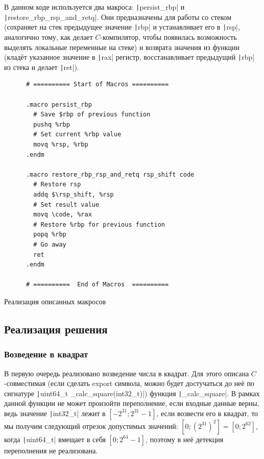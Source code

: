 \documentclass[a4paper]{article}
\begin{document}
  В данном коде используется два макроса: \texttt|persist_rbp| и \texttt|restore_rbp_rsp_and_retq|.
  Они предназначены для работы со стеком (сохраняет на стек предыдущее значение \texttt|rbp|
  и устанавливает его в \texttt|rsp|, аналогично тому, как делает $C$-компилятор, чтобы
  появилась возможность выделять локальные переменные на стеке)
  и возврата значения из функции (кладёт указанное значение в \texttt|rax| регистр,
  восстанавливает предыдущий \texttt|rbp| из стека и делает \texttt|ret|).
  \begin{listing}[H]
    \begin{verbatim}
      # ========== Start of Macros ==========

      .macro persist_rbp
        # Save $rbp of previous function
        pushq %rbp
        # Set current %rbp value
        movq %rsp, %rbp
      .endm
      
      .macro restore_rbp_rsp_and_retq rsp_shift code
        # Restore rsp
        addq $\rsp_shift, %rsp
        # Set result value
        movq \code, %rax
        # Restore %rbp for previous function
        popq %rbp
        # Go away
        ret
      .endm
      
      # ==========  End of Macros  ==========
    \end{verbatim}
    \caption{Реализация описанных макросов}
  \end{listing}

  \subsection{Реализация решения}

  \subsubsection{Возведение в квадрат}

  В первую очередь реализовано возведение числа в квадрат. Для этого
  описана $C$-совместимая (если сделать export символа, можно будет достучаться до неё
  по сигнатуре \texttt|uint64_t _calc_square(int32_t)|) функция \texttt|_calc_square|.
  В рамках данной функции не может произойти переполнение, если входные данные верны,
  ведь значение \texttt|int32_t| лежит в $\left[-2^{31}; 2^{31}-1\right]$,
  если возвести его в квадрат, то мы получим следующий отрезок допустимых значений:
  $\left[0; (2^{31})^2\right] = \left[0; 2^{62}\right]$, когда \texttt|uint64_t|
  вмещает в себя $\left[0; 2^{64} - 1\right]$, поэтому в неё детекция переполнения не реализована.
\end{document}
